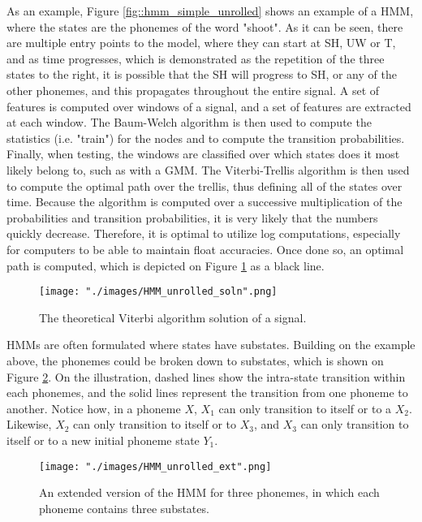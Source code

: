 As an example, Figure \ref{fig::hmm_simple_unrolled} shows an example of a HMM, where the states are the phonemes of the word "shoot". As it can be seen, there are multiple entry points to the model, where they can start at SH, UW or T, and as time progresses, which is demonstrated as the repetition of the three states to the right, it is possible that the SH will progress to SH, or any of the other phonemes, and this propagates throughout the entire signal. A set of features is computed over windows of a signal, and a set of features are extracted at each window. The Baum-Welch algorithm is then used to compute the statistics (i.e. "train") for the nodes and to compute the transition probabilities. Finally, when testing, the windows are classified over which states does it most likely belong to, such as with a GMM. The Viterbi-Trellis algorithm is then used to compute the optimal path over the trellis, thus defining all of the states over time. Because the algorithm is computed over a successive multiplication of the probabilities and transition probabilities, it is very likely that the numbers quickly decrease. Therefore, it is optimal to utilize log computations, especially for computers to be able to maintain float accuracies. Once done so, an optimal path is computed, which is depicted on Figure \ref{fig::hmm_simple_unrolled_soln} as a black line.

\begin{figure}[h]
\begin{center}
    \texttt{[image: "./images/HMM\_unrolled\_soln".png]}
    \caption{The theoretical Viterbi algorithm solution of a signal.}
    \label{fig::hmm_simple_unrolled_soln}
\end{center}
\end{figure}

HMMs are often formulated where states have substates. Building on the example above, the phonemes could be broken down to substates, which is shown on Figure \ref{fig::hmm_unrolled_ext}. On the illustration, dashed lines show the intra-state transition within each phonemes, and the solid lines represent the transition from one phoneme to another. Notice how, in a phoneme $X$, $X_1$ can only transition to itself or to a $X_2$. Likewise, $X_2$ can only transition to itself or to $X_3$, and $X_3$ can only transition to itself or to a new initial phoneme state $Y_1$.

\begin{figure}[h]
\begin{center}
    \texttt{[image: "./images/HMM\_unrolled\_ext".png]}
    \caption{An extended version of the HMM for three phonemes, in which each phoneme contains three substates. }
    \label{fig::hmm_unrolled_ext}
\end{center}
\end{figure}

